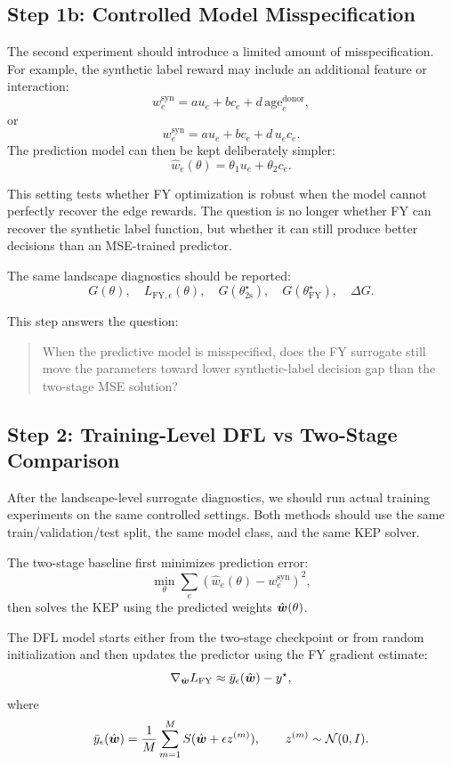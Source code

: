 \documentclass{article}
\begin{document}
\subsection{Step 1b: Controlled Model Misspecification}

The second experiment should introduce a limited amount of misspecification.
For example, the synthetic label reward may include an additional feature or
interaction:
\[
    w^{\mathrm{syn}}_e
    =
    a u_e + b c_e + d\,\mathrm{age}^{\mathrm{donor}}_e,
\]
or
\[
    w^{\mathrm{syn}}_e
    =
    a u_e + b c_e + d\,u_e c_e.
\]
The prediction model can then be kept deliberately simpler:
\[
    \hat w_e(\theta) = \theta_1 u_e + \theta_2 c_e.
\]

This setting tests whether FY optimization is robust when the model cannot
perfectly recover the edge rewards. The question is no longer whether FY can
recover the synthetic label function, but whether it can still produce better
decisions than an MSE-trained predictor.

The same landscape diagnostics should be reported:
\[
    G(\theta), \quad
    L_{\mathrm{FY},\epsilon}(\theta), \quad
    G(\theta^\star_{\mathrm{2s}}), \quad
    G(\theta^\star_{\mathrm{FY}}), \quad
    \Delta G.
\]

This step answers the question:

\begin{quote}
When the predictive model is misspecified, does the FY surrogate still move the
parameters toward lower synthetic-label decision gap than the two-stage MSE
solution?
\end{quote}

\subsection{Step 2: Training-Level DFL vs Two-Stage Comparison}

After the landscape-level surrogate diagnostics, we should run actual training
experiments on the same controlled settings. Both methods should use the same
train/validation/test split, the same model class, and the same KEP solver.

The two-stage baseline first minimizes prediction error:
\[
    \min_{\theta}
    \sum_{e}
    \left(\hat w_e(\theta)-w^{\mathrm{syn}}_e\right)^2,
\]
then solves the KEP using the predicted weights \(\hat {\boldsymbol{w}}(\theta)\).

The DFL model starts either from the two-stage checkpoint or from random
initialization and then updates the predictor using the FY gradient estimate:
\[
    \nabla_{\hat {\boldsymbol{w}}} L_{\mathrm{FY}}
    \approx
    \bar y_{\epsilon}(\hat {\boldsymbol{w}}) - y^\star,
\]
where
\[
    \bar y_{\epsilon}(\hat {\boldsymbol{w}})
    =
    \frac{1}{M}
    \sum_{m=1}^{M}
    S(\hat {\boldsymbol{w}}+\epsilon z^{(m)}),
    \qquad
    z^{(m)}\sim \mathcal{N}(0,I).
\]
\end{document}
